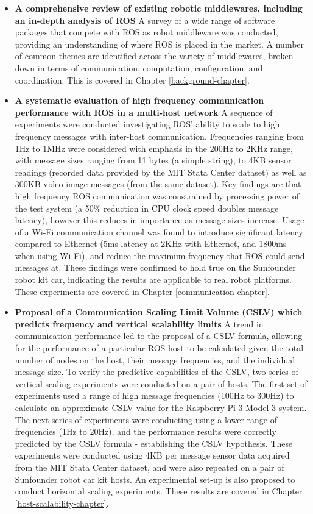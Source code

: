 \documentclass[../dissertation.tex]{subfiles}
\begin{document}
\begin{itemize}

  \item \textbf{A comprehensive review of existing robotic middlewares, including an in-depth analysis of ROS} A survey of a wide range of software packages that compete with ROS as robot middleware was conducted, providing an understanding of where ROS is placed in the market. A number of common themes are identified across the variety of middlewares, broken down in terms of communication, computation, configuration, and coordination. This is covered in Chapter \ref{background-chapter}.

  \item \textbf{A systematic evaluation of high frequency communication performance with ROS in a multi-host network} A sequence of experiments were conducted investigating ROS' ability to scale to high frequency messages with inter-host communication. Frequencies ranging from 1Hz to 1MHz were considered with emphasis in the 200Hz to 2KHz range, with message sizes ranging from 11 bytes (a simple string), to 4KB sensor readings (recorded data provided by the MIT Stata Center dataset\cite{mit-stata-center-dataset}) as well as 300KB video image messages (from the same dataset). Key findings are that high frequency ROS communication was constrained by processing power of the test system (a 50\% reduction in CPU clock speed doubles message latency), however this reduces in importance as message sizes increase. Usage of a Wi-Fi communication channel was found to introduce significant latency compared to Ethernet (5ms latency at 2KHz with Ethernet, and 1800ms when using Wi-Fi), and reduce the maximum frequency that ROS could send messages at. These findings were confirmed to hold true on the Sunfounder robot kit car, indicating the results are applicable to real robot platforms. These experiments are covered in Chapter \ref{communication-chapter}.

  \item \textbf{Proposal of a Communication Scaling Limit Volume (CSLV) which predicts frequency and vertical scalability limits} A trend in communication performance led to the proposal of a CSLV formula, allowing for the performance of a particular ROS host to be calculated given the total number of nodes on the host, their message frequencies, and the individual message size. To verify the predictive capabilities of the CSLV, two series of vertical scaling experiments were conducted on a pair of hosts. The first set of experiments used a range of high message frequencies (100Hz to 300Hz) to calculate an approximate CSLV value for the Raspberry Pi 3 Model 3 system. The next series of experiments were conducting using a lower range of frequencies (1Hz to 20Hz), and the performance results were correctly predicted by the CSLV formula - establishing the CSLV hypothesis. These experiments were conducted using 4KB per message sensor data acquired from the MIT Stata Center dataset\cite{mit-stata-center-dataset}, and were also repeated on a pair of Sunfounder robot car kit hosts. An experimental set-up is also proposed to conduct horizontal scaling experiments. These results are covered in Chapter \ref{host-scalability-chapter}.

\end{itemize}
\end{document}
